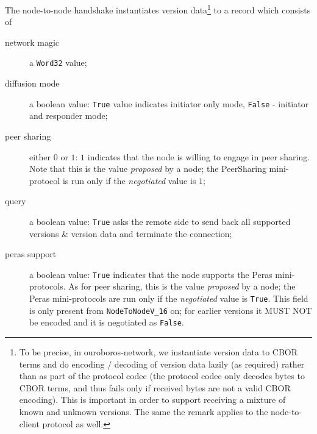 The node-to-node handshake instantiates version data\footnote{To be precise, in
ouroboros-network, we instantiate version data to CBOR terms and do encoding
/ decoding of version data lazily (as required) rather than as part of the
protocol codec (the protocol codec only decodes bytes to CBOR terms, and thus
fails only if received bytes are not a valid CBOR encoding).  This is important
in order to support receiving a mixture of known and unknown versions. The same
the remark applies to the node-to-client protocol as well.} to a record which consists
of
\begin{description}
  \item[network magic] a \texttt{Word32} value;
  \item[diffusion mode] a boolean value: \texttt{True} value indicates
    initiator only mode, \texttt{False} - initiator and responder mode;
  \item[peer sharing] either $0$ or $1$: $1$ indicates that the node is
    willing to engage in peer sharing.  Note that this is the value
    \emph{proposed} by a node; the PeerSharing mini-protocol is run only if
    the \emph{negotiated} value is $1$;
  \item[query] a boolean value: \texttt{True} asks the remote side to send
    back all supported versions \& version data and terminate the connection;
  \item[peras support] a boolean value: \texttt{True} indicates that the node
    supports the Peras mini-protocols.  As for peer sharing, this is the value
    \emph{proposed} by a node; the Peras mini-protocols are run only if the
    \emph{negotiated} value is \texttt{True}.  This field is only present from
    \texttt{NodeToNodeV\_16} on; for earlier versions it MUST NOT be encoded
    and it is negotiated as \texttt{False}.
\end{description}

